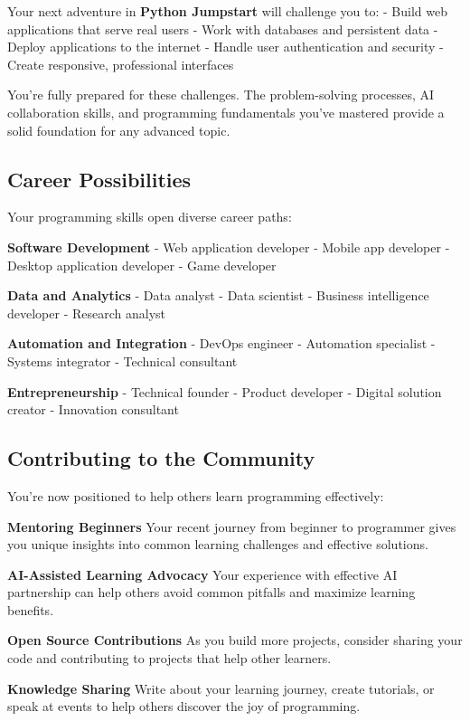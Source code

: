\documentclass[
  letterpaper,
  DIV=11,
  numbers=noendperiod,
  oneside]{scrreprt}
\begin{document}
Your next adventure in \textbf{Python Jumpstart} will challenge you to:
- Build web applications that serve real users - Work with databases and
persistent data - Deploy applications to the internet - Handle user
authentication and security - Create responsive, professional interfaces

You're fully prepared for these challenges. The problem-solving
processes, AI collaboration skills, and programming fundamentals you've
mastered provide a solid foundation for any advanced topic.

\subsection{Career Possibilities}\label{career-possibilities}

Your programming skills open diverse career paths:

\textbf{Software Development} - Web application developer - Mobile app
developer - Desktop application developer - Game developer

\textbf{Data and Analytics} - Data analyst - Data scientist - Business
intelligence developer - Research analyst

\textbf{Automation and Integration} - DevOps engineer - Automation
specialist - Systems integrator - Technical consultant

\textbf{Entrepreneurship} - Technical founder - Product developer -
Digital solution creator - Innovation consultant

\subsection{Contributing to the
Community}\label{contributing-to-the-community}

You're now positioned to help others learn programming effectively:

\textbf{Mentoring Beginners} Your recent journey from beginner to
programmer gives you unique insights into common learning challenges and
effective solutions.

\textbf{AI-Assisted Learning Advocacy} Your experience with effective AI
partnership can help others avoid common pitfalls and maximize learning
benefits.

\textbf{Open Source Contributions} As you build more projects, consider
sharing your code and contributing to projects that help other learners.

\textbf{Knowledge Sharing} Write about your learning journey, create
tutorials, or speak at events to help others discover the joy of
programming.
\end{document}
